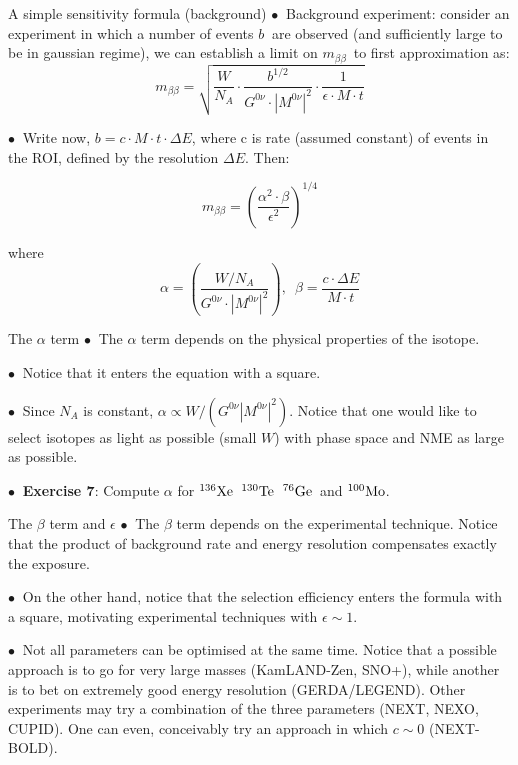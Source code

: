 \documentclass [aspectratio=169]{beamer}
\newcommand{\mbb}{\ensuremath{m_{\beta\beta}}}
\newcommand{\gonu}{\ensuremath{G^{0\nu}}}
\newcommand{\monu}{\ensuremath{|M^{0\nu}|^2}}
\newcommand{\XE}{\ensuremath{{}^{136}{\rm Xe}}}
\newcommand{\GE}{\ensuremath{{}^{76}{\rm Ge}}}
\newcommand{\TE}{\ensuremath{{}^{130}{\rm Te}}}
\newcommand{\MO}{\ensuremath{{}^{100}{\rm Mo}}}
\begin{document}
\begin{frame}{A simple sensitivity formula (background)}
$\bullet~$ Background experiment: consider an experiment in which a number of events $b~$ are observed (and sufficiently large to be in gaussian regime), we can establish a limit on \mbb\, to first approximation as:
\[
\mbb = \sqrt{\frac{W}{N_A}\cdot \frac{b^{1/2}}{\gonu\cdot\monu}\cdot \frac{1}{\epsilon\cdot M \cdot t}}
\]

$\bullet~$ Write now, $b = c \cdot M \cdot t \cdot \Delta E$, where c is rate (assumed constant) of events in the ROI, defined by the resolution $\Delta E$. Then: 

\[
\mbb = (\frac{\alpha^2 \cdot \beta}{\epsilon^2})^{1/4}
\]

where
\[
\alpha = (\frac{W/N_A}{\gonu\cdot\monu}), \, \, \, \beta = \frac{c\cdot \Delta E}{M\cdot t}
\]
\end{frame}


\begin{frame}{The $\alpha$ term}
$\bullet~$ The $\alpha$ term depends on the physical properties of the isotope.

 $\bullet~$ Notice that it enters the equation with a square.
 
 $\bullet~$ Since $N_A$ is constant, $\alpha \propto W/(\gonu\monu)$. Notice that one would like to select isotopes as light as possible (small $W$) with phase space and NME as large as possible. 
 
 $\bullet~$ {\bf Exercise 7}: Compute $\alpha$ for \XE\, \TE\, \GE\ and \MO. 
 \end{frame}
 
 
 \begin{frame}{The $\beta$ term and $\epsilon$}
$\bullet~$ The $\beta$ term depends on the experimental technique. Notice that the product of background rate and energy resolution compensates exactly the exposure. 

 $\bullet~$ On the other hand, notice that the selection efficiency enters the formula with a square, motivating experimental techniques with $\epsilon \sim 1$. 
 
 $\bullet~$ Not all parameters can be optimised at the same time. Notice that a possible approach is to go for very large masses (KamLAND-Zen, SNO+), while another is to bet on extremely good energy resolution (GERDA/LEGEND). Other experiments may try a combination of the three parameters (NEXT, NEXO, CUPID). One can even, conceivably try an approach in which $c \sim 0$ (NEXT-BOLD). 
 
 \end{frame}
 
\end{document}
